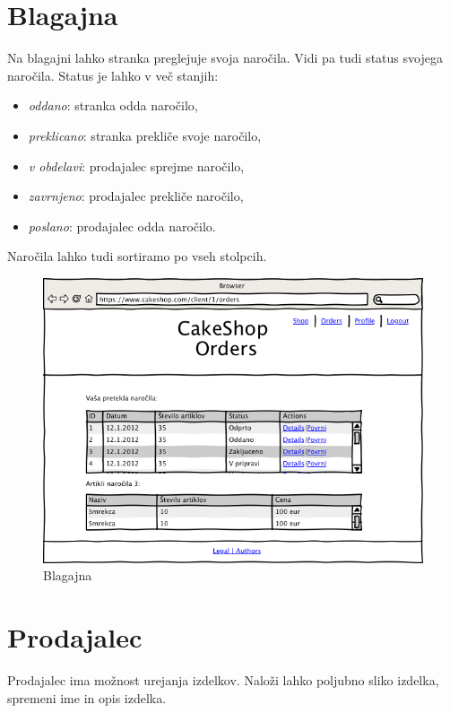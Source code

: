 \documentclass[a4paper,12pt]{report}
\begin{document}
\section{Blagajna}

Na blagajni lahko stranka preglejuje svoja naročila. Vidi pa tudi status svojega naročila. Status je lahko v več stanjih:

\begin{itemize}
  \item {\it oddano}: stranka odda naročilo,
  \item {\it preklicano}: stranka prekliče svoje naročilo,
  \item {\it v obdelavi}: prodajalec sprejme naročilo,
  \item {\it zavrnjeno}: prodajalec prekliče naročilo,
  \item {\it poslano}: prodajalec odda naročilo.
\end{itemize}

Naročila lahko tudi sortiramo po vseh stolpcih.

\begin{figure}[htb]
	\centering
	\includegraphics[width=13cm]{Wireframes/cakeshop/pngs/020300-OrdersViewClient.png}
	\caption{Blagajna}
\label{fig:5}
\end{figure}

\section{Prodajalec}

Prodajalec ima možnost urejanja izdelkov. Naloži lahko poljubno sliko izdelka, spremeni ime in opis izdelka.
\end{document}
